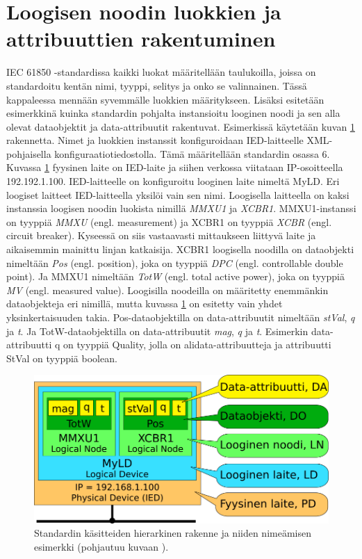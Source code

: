 \section{Loogisen noodin luokkien ja attribuuttien rakentuminen}
\label{ch:luokkien-rakentuminen-instanseista}
IEC 61850 -standardissa kaikki luokat määritellään taulukoilla, joissa on standardoitu kentän nimi, tyyppi, selitys ja onko se valinnainen. Tässä kappaleessa mennään syvemmälle luokkien määritykseen. Lisäksi esitetään esimerkkinä kuinka standardin pohjalta instansioitu looginen noodi ja sen alla olevat dataobjektit ja data-attribuutit rakentuvat. Esimerkissä käytetään kuvan \ref{fig:iec61850-data-modeling} rakennetta. Nimet ja luokkien instanssit konfiguroidaan IED-laitteelle XML-pohjaisella konfiguraatiotiedostolla. Tämä määritellään standardin osassa 6. Kuvassa \ref{fig:iec61850-data-modeling} fyysinen laite on IED-laite ja siihen verkossa viitataan IP-osoitteella 192.192.1.100. IED-laitteelle on konfiguroitu looginen laite nimeltä MyLD. Eri loogiset laitteet IED-laitteella yksilöi vain sen nimi. Loogisella laitteella on kaksi instanssia loogisen noodin luokista nimillä \emph{MMXU1} ja \emph{XCBR1}. MMXU1-instanssi on tyyppiä \emph{MMXU} (engl. measurement) \mbox{\cite[s.~57--58]{IEC61850-7-4}} ja XCBR1 on tyyppiä \emph{XCBR} (engl. circuit breaker). Kyseessä on siis vastaavasti mittaukseen liittyvä laite ja aikaisemmin mainittu linjan katkaisija. XCBR1 loogisella noodilla on dataobjekti nimeltään \emph{Pos} (engl. position), joka on tyyppiä \emph{DPC} (engl. controllable double point). Ja MMXU1 nimeltään \emph{TotW} (engl. total active power), joka on tyyppiä \emph{MV} (engl. measured value). Loogisilla noodeilla on määritetty enemmänkin dataobjekteja eri nimillä, mutta kuvassa \ref{fig:iec61850-data-modeling} on esitetty vain yhdet yksinkertaisuuden takia. Pos-dataobjektilla on data-attribuutit nimeltään \emph{stVal}, \emph{q} ja \emph{t}. Ja TotW-dataobjektilla on data-attribuutit \emph{mag}, \emph{q} ja \emph{t}. Esimerkin data-attribuutti q on tyyppiä Quality, jolla on alidata-attribuutteja ja attribuutti StVal on tyyppiä boolean. \mbox{\cite{IEC61850-7-3, IEC61850-7-4}}

\begin{figure}[ht!]
	\includegraphics[width=1\textwidth]{pictures/iec61850-data-modeling.png}
	\caption{Standardin käsitteiden hierarkinen rakenne ja niiden nimeämisen esimerkki (pohjautuu kuvaan \mbox{\cite[s.~24]{IEC61850-1}}).}
	\label{fig:iec61850-data-modeling}
\end{figure}

